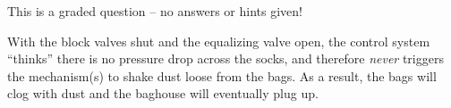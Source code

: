 \vfil

\eject






This is a graded question -- no answers or hints given!







With the block valves shut and the equalizing valve open, the control system ``thinks'' there is no pressure drop across the socks, and therefore {\it never} triggers the mechanism(s) to shake dust loose from the bags.  As a result, the bags will clog with dust and the baghouse will eventually plug up.




